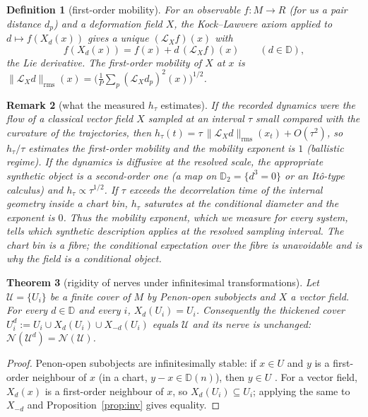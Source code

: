\documentclass[11pt]{article}
\newtheorem{definition}{Definition}[section]
\newtheorem{theorem}[definition]{Theorem}
\newtheorem{remark}[definition]{Remark}
\newcommand{\N}{\mathcal{N}}
\newcommand{\U}{\mathcal{U}}
\newcommand{\D}{\mathbb{D}}
\newcommand{\Lie}{\mathcal{L}}
\begin{document}
\begin{definition}[first-order mobility]
For an observable $f:M\to R$ (for us a pair distance $d_p$) and a deformation field $X$, the Kock--Lawvere axiom applied to $d\mapsto f(X_d(x))$ gives a unique $(\Lie_X f)(x)$ with
\[
f(X_d(x))=f(x)+d\,(\Lie_X f)(x)\qquad(d\in\D),
\]
the Lie derivative. The \emph{first-order mobility} of $X$ at $x$ is $\|\Lie_X d\|_{\mathrm{rms}}(x)=\big(\tfrac1P\sum_p(\Lie_X d_p)^2(x)\big)^{1/2}$.
\end{definition}

\begin{remark}[what the measured $h_\tau$ estimates]
If the recorded dynamics were the flow of a classical vector field $X$ sampled at an interval $\tau$ small compared with the curvature of the trajectories, then $h_\tau(t)=\tau\,\|\Lie_X d\|_{\mathrm{rms}}(x_t)+O(\tau^2)$, so $h_\tau/\tau$ estimates the first-order mobility and the mobility exponent is $1$ (ballistic regime). If the dynamics is diffusive at the resolved scale, the appropriate synthetic object is a second-order one (a map on $\D_2=\{d^3=0\}$ or an It\^o-type calculus) and $h_\tau\propto\tau^{1/2}$. If $\tau$ exceeds the decorrelation time of the internal geometry inside a chart bin, $h_\tau$ saturates at the conditional diameter and the exponent is $0$. Thus the mobility exponent, which we measure for every system, tells which synthetic description applies at the resolved sampling interval. The chart bin is a fibre; the conditional expectation over the fibre is unavoidable and is why the field is a \emph{conditional} object.
\end{remark}

\begin{theorem}[rigidity of nerves under infinitesimal transformations]\label{thm:rigid}
Let $\U=\{U_i\}$ be a finite cover of $M$ by Penon-open subobjects and $X$ a vector field. For every $d\in\D$ and every $i$, $X_d(U_i)=U_i$. Consequently the thickened cover $U_i^{d}:=U_i\cup X_d(U_i)\cup X_{-d}(U_i)$ equals $\U$ and its nerve is unchanged: $\N(\U^{d})=\N(\U)$.
\end{theorem}
\begin{proof}
Penon-open subobjects are infinitesimally stable: if $x\in U$ and $y$ is a first-order neighbour of $x$ (in a chart, $y-x\in\D(n)$), then $y\in U$ \cite{penon,kock2006}. For a vector field, $X_d(x)$ is a first-order neighbour of $x$, so $X_d(U_i)\subseteq U_i$; applying the same to $X_{-d}$ and Proposition~\ref{prop:inv} gives equality.
\end{proof}
\end{document}
